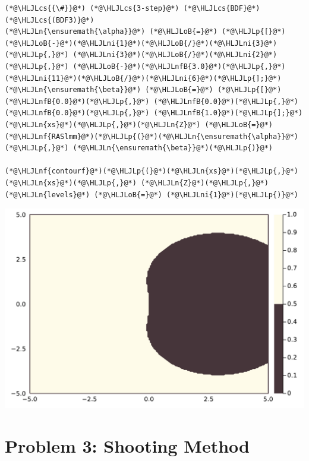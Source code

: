 \documentclass[12pt,a4paper]{article}
\newcommand{\HLJLn}[1]{#1}
\newcommand{\HLJLnf}[1]{\textcolor[RGB]{66,102,213}{#1}}
\newcommand{\HLJLnfB}[1]{\textcolor[RGB]{59,151,46}{#1}}
\newcommand{\HLJLni}[1]{\textcolor[RGB]{59,151,46}{#1}}
\newcommand{\HLJLoB}[1]{\textcolor[RGB]{102,102,102}{\textbf{#1}}}
\newcommand{\HLJLp}[1]{#1}
\newcommand{\HLJLcs}[1]{\textcolor[RGB]{153,153,119}{\textit{#1}}}
\begin{document}
\begin{lstlisting}
(*@\HLJLcs{{\#}}@*) (*@\HLJLcs{3-step}@*) (*@\HLJLcs{BDF}@*) (*@\HLJLcs{(BDF3)}@*)
(*@\HLJLn{\ensuremath{\alpha}}@*) (*@\HLJLoB{=}@*) (*@\HLJLp{[}@*)(*@\HLJLoB{-}@*)(*@\HLJLni{1}@*)(*@\HLJLoB{/}@*)(*@\HLJLni{3}@*)(*@\HLJLp{,}@*) (*@\HLJLni{3}@*)(*@\HLJLoB{/}@*)(*@\HLJLni{2}@*)(*@\HLJLp{,}@*) (*@\HLJLoB{-}@*)(*@\HLJLnfB{3.0}@*)(*@\HLJLp{,}@*) (*@\HLJLni{11}@*)(*@\HLJLoB{/}@*)(*@\HLJLni{6}@*)(*@\HLJLp{];}@*) (*@\HLJLn{\ensuremath{\beta}}@*) (*@\HLJLoB{=}@*) (*@\HLJLp{[}@*)(*@\HLJLnfB{0.0}@*)(*@\HLJLp{,}@*) (*@\HLJLnfB{0.0}@*)(*@\HLJLp{,}@*) (*@\HLJLnfB{0.0}@*)(*@\HLJLp{,}@*) (*@\HLJLnfB{1.0}@*)(*@\HLJLp{];}@*)
(*@\HLJLn{xs}@*)(*@\HLJLp{,}@*)(*@\HLJLn{Z}@*) (*@\HLJLoB{=}@*) (*@\HLJLnf{RASlmm}@*)(*@\HLJLp{(}@*)(*@\HLJLn{\ensuremath{\alpha}}@*)(*@\HLJLp{,}@*) (*@\HLJLn{\ensuremath{\beta}}@*)(*@\HLJLp{)}@*)

(*@\HLJLnf{contourf}@*)(*@\HLJLp{(}@*)(*@\HLJLn{xs}@*)(*@\HLJLp{,}@*) (*@\HLJLn{xs}@*)(*@\HLJLp{,}@*) (*@\HLJLn{Z}@*)(*@\HLJLp{,}@*) (*@\HLJLn{levels}@*) (*@\HLJLoB{=}@*) (*@\HLJLni{1}@*)(*@\HLJLp{)}@*)
\end{lstlisting}

\includegraphics[width=\linewidth]{figures/ass_4_report_5_1.pdf}

\section{Problem 3: Shooting Method}
\end{document}
